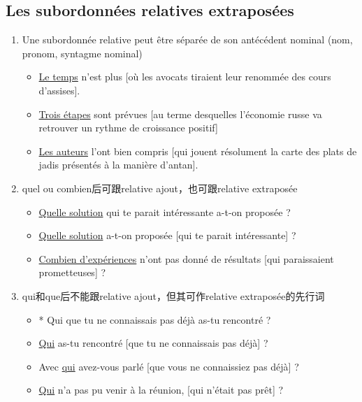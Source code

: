 \documentclass[UTF8]{report}
\begin{document}
\subsection{Les subordonnées relatives extraposées}
\begin{enumerate}
    \item Une subordonnée relative peut être séparée de son antécédent nominal (nom, pronom, syntagme nominal)
        \begin{itemize}
            \item \underline{Le temps} n’est plus [où les avocats tiraient leur renommée des cours d’assises]. 
            \item \underline{Trois étapes} sont prévues [au terme desquelles l’économie russe va retrouver un rythme de croissance positif]
            \item \underline{Les auteurs} l’ont bien compris [qui jouent résolument la carte des plats de jadis présentés à la manière d’antan].
        \end{itemize}
    \item quel ou combien后可跟relative ajout，也可跟relative extraposée
    \begin{itemize}
        \item \underline{Quelle solution} qui te parait intéressante a-t-on proposée ?
        \item \underline{Quelle solution} a-t-on proposée [qui te parait intéressante] ?
        \item \underline{Combien d’expériences} n’ont pas donné de résultats [qui paraissaient prometteuses] ?
    \end{itemize}
    \item qui和que后不能跟relative ajout，但其可作relative extraposée的先行词
    \begin{itemize}
        \item * Qui que tu ne connaissais pas déjà as-tu rencontré ?
        \item \underline{Qui} as-tu rencontré [que tu ne connaissais pas déjà] ?
        \item Avec \underline{qui} avez-vous parlé [que vous ne connaissiez pas déjà] ?
        \item \underline{Qui} n’a pas pu venir à la réunion, [qui n’était pas prêt] ?
    \end{itemize}
\end{enumerate}
\end{document}
